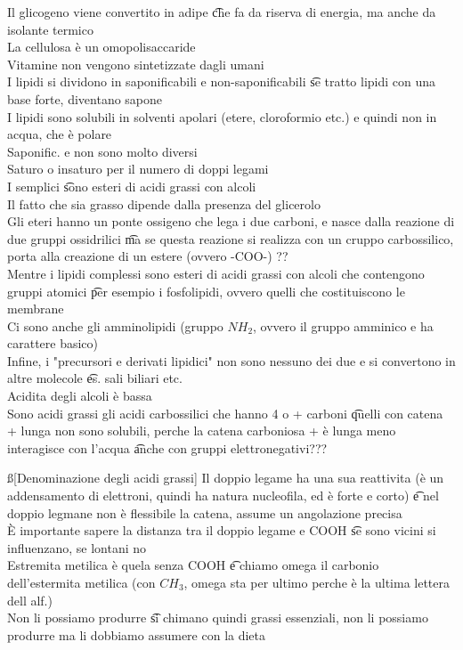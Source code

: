 \documentclass[12pt]{article}
\begin{document}
\s[Lipidi]
Il glicogeno viene convertito in adipe \t che fa da riserva di energia, ma anche da isolante termico \\
La cellulosa è un omopolisaccaride \\
Vitamine non vengono sintetizzate dagli umani \\
I lipidi si dividono in saponificabili e non-saponificabili \t se tratto lipidi con una base forte, diventano sapone \\
I lipidi sono solubili in solventi apolari (etere, cloroformio etc.) e quindi non in acqua, che è polare \\
Saponific. e non sono molto diversi \\
Saturo o insaturo per il numero di doppi legami \\
I semplici \t sono esteri di acidi grassi con alcoli \\
Il fatto che sia grasso dipende dalla presenza del glicerolo \\
Gli eteri hanno un ponte ossigeno che lega i due carboni, e nasce dalla reazione di due gruppi ossidrilici \t ma se questa reazione si realizza con un cruppo carbossilico, porta alla creazione di un estere (ovvero -COO-) ?? \\
Mentre i lipidi complessi sono esteri di acidi grassi con alcoli che contengono gruppi atomici \t per esempio i fosfolipidi, ovvero quelli che costituiscono le membrane \\
Ci sono anche gli amminolipidi (gruppo $NH_2$, ovvero il gruppo amminico e ha carattere basico) \\
Infine, i "precursori e derivati lipidici" non sono nessuno dei due e si convertono in altre molecole \t es. sali biliari etc. \\
Acidita degli alcoli è bassa \\
Sono acidi grassi gli acidi carbossilici che hanno 4 o + carboni \t quelli con catena + lunga non sono solubili, perche la catena carboniosa + è lunga meno interagisce con l'acqua \t anche con gruppi elettronegativi???

\ss[Denominazione degli acidi grassi]
Il doppio legame ha una sua reattivita (è un addensamento di elettroni, quindi ha natura nucleofila, ed è forte e corto) \t e nel doppio legmane non è flessibile la catena, assume un angolazione precisa \\
È importante sapere la distanza tra il doppio legame e COOH \t se sono vicini si influenzano, se lontani no \\
Estremita metilica è quela senza COOH \t e chiamo omega il carbonio dell'estermita metilica (con $CH_3$, omega sta per ultimo perche è la ultima lettera dell alf.) \\
Non li possiamo produrre \t si chimano quindi grassi essenziali, non li possiamo produrre ma li dobbiamo assumere con la dieta 
\end{document}
